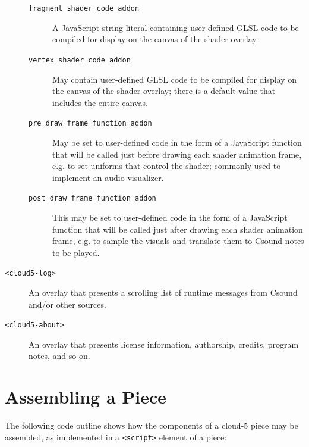 \documentclass[runningheads,a4paper]{llncs}
\begin{document}
\begin{description}
\begin{description}
\item[\texttt{fragment\_shader\_code\_addon}] A JavaScript string literal containing user-defined GLSL code to be compiled for display on the canvas of the shader overlay.
\item[\texttt{vertex\_shader\_code\_addon}] May contain user-defined GLSL code to be compiled for display on the canvas of the shader overlay; there is a default value that includes the entire canvas.
\item[\texttt{pre\_draw\_frame\_function\_addon}] May be set to user-defined code in the form of a JavaScript function that will be called just before drawing each shader animation frame, e.g. to set uniforms that control the shader; commonly used to implement an audio visualizer.
\item[\texttt{post\_draw\_frame\_function\_addon}] This may be set to user-defined code in the form of a JavaScript function that will be called just after drawing each shader animation frame, e.g. to sample the visuals and translate them to Csound notes to be played.
\end{description}
\item[\texttt{<cloud5-log>}] An overlay that presents a scrolling list of runtime messages from Csound and/or other sources.
\item[\texttt{<cloud5-about>}] An overlay that presents license information, authorship, credits, program notes, and so on.
\end{description}

\section{Assembling a Piece}

The following code outline shows how the components of a cloud-5 piece may be assembled, as implemented in a \verb|<script>| element of a piece:
\end{document}
